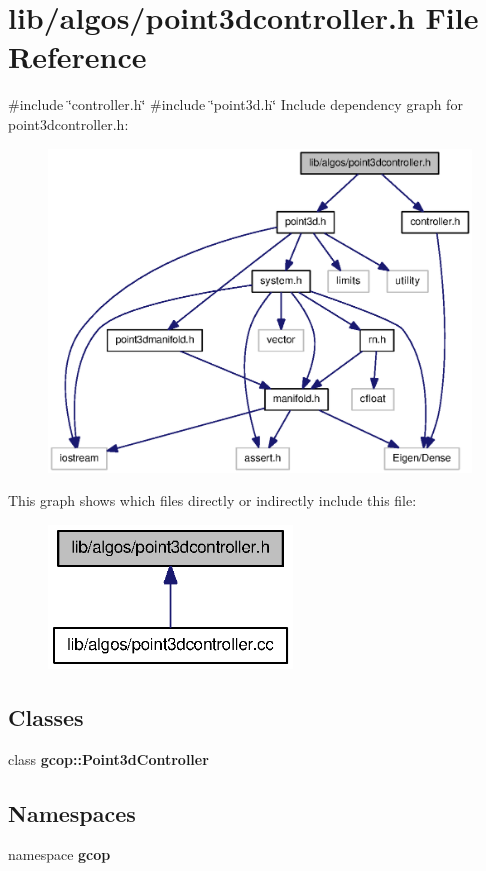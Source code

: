 \section{lib/algos/point3dcontroller.h \-File \-Reference}
\label{point3dcontroller_8h}
{\ttfamily \#include \char`\"{}controller.\-h\char`\"{}}\*
{\ttfamily \#include \char`\"{}point3d.\-h\char`\"{}}\*
\-Include dependency graph for point3dcontroller.\-h\-:
\nopagebreak
\begin{figure}[H]
\begin{center}
\leavevmode
\includegraphics[width=350pt]{point3dcontroller_8h__incl}
\end{center}
\end{figure}
\-This graph shows which files directly or indirectly include this file\-:
\nopagebreak
\begin{figure}[H]
\begin{center}
\leavevmode
\includegraphics[width=184pt]{point3dcontroller_8h__dep__incl}
\end{center}
\end{figure}
\subsection*{\-Classes}
\begin{DoxyCompactItemize}
\item 
class {\bf gcop\-::\-Point3d\-Controller}
\end{DoxyCompactItemize}
\subsection*{\-Namespaces}
\begin{DoxyCompactItemize}
\item 
namespace {\bf gcop}
\end{DoxyCompactItemize}
